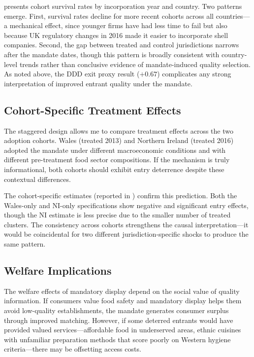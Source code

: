 \documentclass[12pt]{article}
\begin{document}
 presents cohort survival rates by incorporation year and country. Two patterns emerge. First, survival rates decline for more recent cohorts across all countries---a mechanical effect, since younger firms have had less time to fail but also because UK regulatory changes in 2016 made it easier to incorporate shell companies. Second, the gap between treated and control jurisdictions narrows after the mandate dates, though this pattern is broadly consistent with country-level trends rather than conclusive evidence of mandate-induced quality selection. As noted above, the DDD exit proxy result ($+0.67$) complicates any strong interpretation of improved entrant quality under the mandate.

\subsection{Cohort-Specific Treatment Effects}

The staggered design allows me to compare treatment effects across the two adoption cohorts. Wales (treated 2013) and Northern Ireland (treated 2016) adopted the mandate under different macroeconomic conditions and with different pre-treatment food sector compositions. If the mechanism is truly informational, both cohorts should exhibit entry deterrence despite these contextual differences.

The cohort-specific estimates (reported in ) confirm this prediction. Both the Wales-only and NI-only specifications show negative and significant entry effects, though the NI estimate is less precise due to the smaller number of treated clusters. The consistency across cohorts strengthens the causal interpretation---it would be coincidental for two different jurisdiction-specific shocks to produce the same pattern.

\subsection{Welfare Implications}

The welfare effects of mandatory display depend on the social value of quality information. If consumers value food safety and mandatory display helps them avoid low-quality establishments, the mandate generates consumer surplus through improved matching. However, if some deterred entrants would have provided valued services---affordable food in underserved areas, ethnic cuisines with unfamiliar preparation methods that score poorly on Western hygiene criteria---there may be offsetting access costs.
\end{document}
